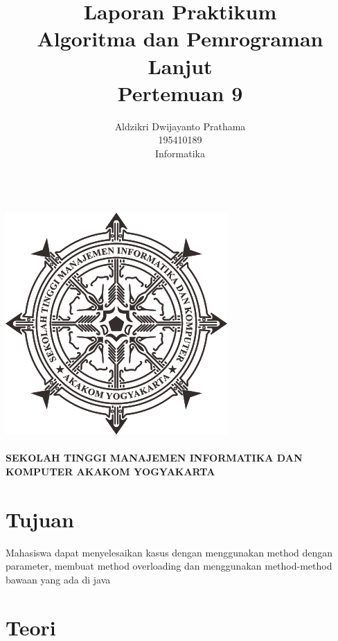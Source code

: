 \documentclass[a4paper,12pt]{article}
\begin{document}
\title{ {\Large Laporan Praktikum}\\ Algoritma dan Pemrograman Lanjut\\{\Large Pertemuan 9}}

\author{Aldzikri Dwijayanto Prathama
    \\195410189
    \\Informatika}
\makeatletter
\begin{titlepage}
    \begin{center}
        {\huge \bfseries \@title}\\[14ex]
        \includegraphics[scale=.8]{logo}\\[4ex]
        {\large \@author}\\[12ex]
        {\large \bfseries {SEKOLAH TINGGI MANAJEMEN INFORMATIKA DAN KOMPUTER
            AKAKOM YOGYAKARTA}}
    \end{center}


\end{titlepage}
\makeatother
\newpage
\tableofcontents
\newpage

\section{Tujuan}
Mahasiswa dapat menyelesaikan kasus dengan menggunakan method dengan parameter, membuat method overloading dan
menggunakan method-method bawaan yang ada di java

\section{Teori}
\end{document}
